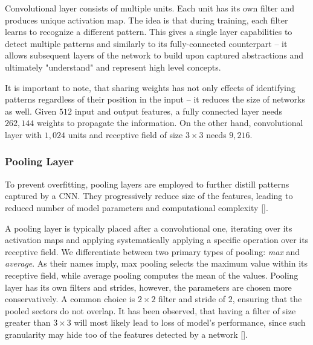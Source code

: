 Convolutional layer consists of multiple units. Each unit has its own filter and produces unique activation map. The idea is that during training, each filter learns to recognize a different pattern. This gives a single layer capabilities to detect multiple patterns and similarly to its fully-connected counterpart -- it allows subsequent layers of the network to build upon captured abstractions and ultimately "understand" and represent high level concepts.

It is important to note, that sharing weights has not only effects of identifying patterns regardless of their position in the input -- it reduces the size of networks as well. Given $512$ input and output features, a fully connected layer needs $262,144$ weights to propagate the information. On the other hand, convolutional layer with $1,024$ units and receptive field of size $3 \times 3$ needs $9,216$.

\subsubsection{Pooling Layer}

To prevent overfitting, pooling layers are employed to further distill patterns captured by a CNN. They progressively reduce size of the features, leading to reduced number of model parameters and computational complexity [].

A pooling layer is typically placed after a convolutional one, iterating over its activation maps and applying systematically applying a specific operation over its receptive field. We differentiate between two primary types of pooling: \emph{max} and \emph{average}. As their names imply, max pooling selects the maximum value within its receptive field, while average pooling computes the mean of the values. Pooling layer has its own filters and strides, however, the parameters are chosen more conservatively. A common choice is $2 \times 2$ filter and stride of $2$, ensuring that the pooled sectors do not overlap. It has been observed, that having a filter of size greater than $3 \times 3$ will most likely lead to loss of model's performance, since such granularity may hide too of the features detected by a network [].

